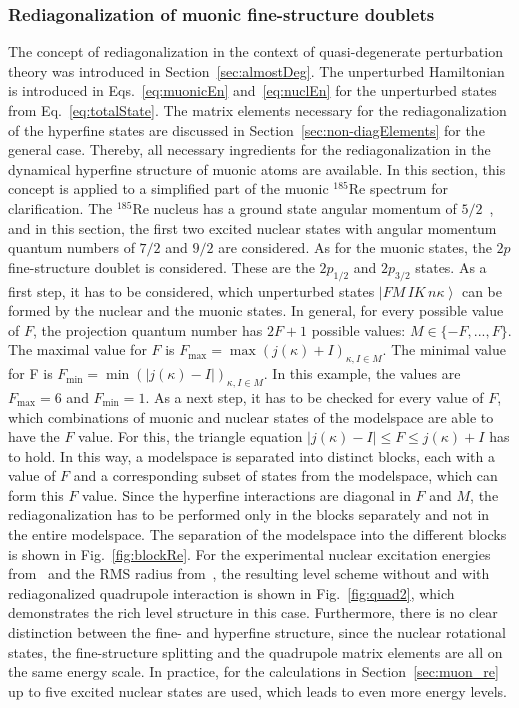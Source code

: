 \subsubsection{Rediagonalization of muonic fine-structure doublets}
\label{sec:toyModelRediag}
The concept of rediagonalization in the context of quasi-degenerate perturbation theory was introduced in Section~\ref{sec:almostDeg}. The unperturbed Hamiltonian is introduced in Eqs.~\eqref{eq:muonicEn} and~\eqref{eq:nuclEn} for the unperturbed states from Eq.~\eqref{eq:totalState}. The matrix elements necessary for the rediagonalization of the hyperfine states are discussed in Section~\ref{sec:non-diagElements} for the general case. Thereby, all necessary ingredients for the rediagonalization in the dynamical hyperfine structure of muonic atoms are available. In this section, this concept is applied to a simplified part of the muonic $^{185}$Re spectrum for clarification. The $^{185}$Re nucleus has a ground state angular momentum of $5/2$~\cite{Stone2005}, and in this section, the first two excited nuclear states with angular momentum quantum numbers of $7/2$ and $9/2$ are considered. As for the muonic states, the $2p$ fine-structure doublet is considered. These are the $2p_{1/2}$ and $2p_{3/2}$ states.
As a first step, it has to be considered, which unperturbed states $\left|FM\,IK\,n\kappa\right>$ can be formed by the nuclear and the muonic states. In general, for every possible value of $F$, the projection quantum number has $2F+1$ possible values: $M\in \{-F,...,F\}$. The maximal value for $F$ is $F_{\text{max}}=\max(j(\kappa)+I)_{\kappa, I \in M}$. The minimal value for F is $F_{\text{min}}=\min(|j(\kappa)-I|)_{\kappa, I \in M}$. In this example, the values are $F_{\text{max}}=6$ and $F_{\text{min}}=1$. As a next step, it has to be checked for every value of $F$, which combinations of muonic and nuclear states of the modelspace are able to have the $F$ value. For this, the triangle equation $|j(\kappa)-I|\leq F \leq j(\kappa)+I$ has to hold. In this way, a modelspace is separated into distinct blocks, each with a value of $F$ and a corresponding subset of states from the modelspace, which can form this $F$ value. Since the hyperfine interactions are diagonal in $F$ and $M$, the rediagonalization has to be performed only in the blocks separately and not in the entire modelspace. The separation of the modelspace into the different blocks is shown in Fig.~\ref{fig:blockRe}. For the experimental nuclear excitation energies from~\cite{ENSDF} and the RMS radius from~\cite{Angeli2013}, the resulting level scheme without and with rediagonalized quadrupole interaction is shown in Fig.~\ref{fig:quad2}, which demonstrates the rich level structure in this case. Furthermore, there is no clear distinction between the fine- and hyperfine structure, since the nuclear rotational states, the fine-structure splitting and the quadrupole matrix elements are all on the same energy scale. In practice, for the calculations in Section~\ref{sec:muon_re} up to five excited nuclear states are used, which leads to even more energy levels.

